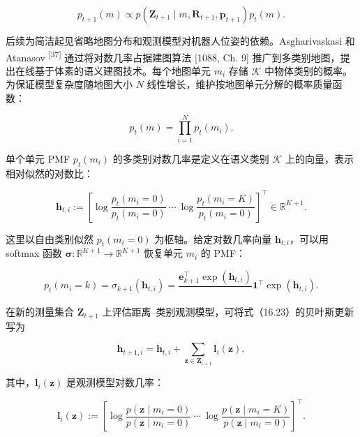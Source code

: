 \begin{equation}
p_{t+1}(m)\propto p(\boldsymbol{Z}_{t+1}\mid m,\boldsymbol{R}_{t+1},\boldsymbol{p}_{t+1})p_t(m).\tag{16.23}
\end{equation}

后续为简洁起见省略地图分布和观测模型对机器人位姿的依赖。Asgharivaskasi 和 Atanasov \textsuperscript{[37]} 通过将对数几率占据建图算法 [1088, Ch. 9] 推广到多类别地图，提出在线基于体素的语义建图技术。每个地图单元 $m_i$ 存储 $\mathcal{K}$ 中物体类别的概率。为保证模型复杂度随地图大小 $N$ 线性增长，维护按地图单元分解的概率质量函数：

\begin{equation*}
p_t(m)=\prod_{i=1}^{N}p_t(m_i).
\end{equation*}

单个单元 PMF $p_t(m_i)$ 的多类别对数几率是定义在语义类别 $\mathcal{K}$ 上的向量，表示相对似然的对数比：

\begin{equation*}
\boldsymbol{h}_{t,i}:=
\left[\log\frac{p_t(m_i=0)}{p_t(m_i=0)}\ \cdots\
\log\frac{p_t(m_i=K)}{p_t(m_i=0)}\right]^{\top}\in\mathbb{R}^{K+1}.
\end{equation*}

这里以自由类别似然 $p_t(m_i=0)$ 为枢轴。给定对数几率向量 $\boldsymbol{h}_{t,i}$，可以用 softmax 函数 $\boldsymbol{\sigma}:\mathbb{R}^{K+1}\to\mathbb{R}^{K+1}$ 恢复单元 $m_i$ 的 PMF：

\begin{equation*}
p_t(m_i=k)=\sigma_{k+1}(\boldsymbol{h}_{t,i})
=\frac{\boldsymbol{e}_{k+1}^{\top}\exp(\boldsymbol{h}_{t,i})}
\ {\boldsymbol{1}^{\top}\exp(\boldsymbol{h}_{t,i})}.
\end{equation*}

在新的测量集合 $\boldsymbol{Z}_{t+1}$ 上评估距离--类别观测模型，可将式（16.23）的贝叶斯更新写为

\begin{equation}
\boldsymbol{h}_{t+1,i}=\boldsymbol{h}_{t,i}+\sum_{\boldsymbol{z}\in\boldsymbol{Z}_{t+1}}\boldsymbol{l}_i(\boldsymbol{z}),\tag{16.24}
\end{equation}

其中，$\boldsymbol{l}_i(\boldsymbol{z})$ 是观测模型对数几率：

\begin{equation}
\boldsymbol{l}_i(\boldsymbol{z}):=
\left[\log\frac{p(\boldsymbol{z}\mid m_i=0)}{p(\boldsymbol{z}\mid m_i=0)}
\ \cdots\
\log\frac{p(\boldsymbol{z}\mid m_i=K)}{p(\boldsymbol{z}\mid m_i=0)}\right]^{\top}.\tag{16.25}
\end{equation}

